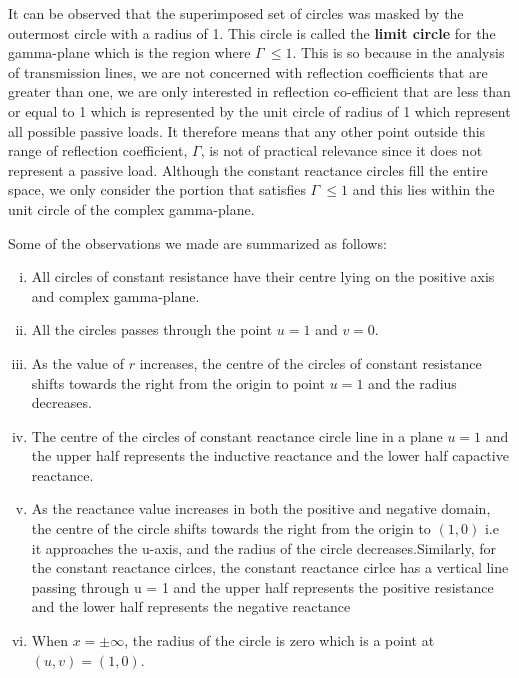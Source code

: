 It can be observed that the superimposed set of circles was masked by the outermost circle with a radius of 1. This circle is called the \textbf{limit circle} for the gamma-plane which is the region where $\Gamma\ \leq 1$. This is so because in the analysis of transmission lines, we are not concerned with reflection coefficients that are greater than one, we are only interested in reflection co-efficient that are less than or equal to 1 which is represented by the unit circle of radius of 1 which represent all possible passive loads. It therefore means that any other point outside this range of reflection coefficient, $\Gamma$, is not of practical relevance since it does not represent a passive load. Although the constant reactance circles fill the entire space, we only consider the portion that satisfies $ \Gamma\ \leq 1$ and this lies within the unit circle of the complex gamma-plane.

Some of the observations we made are summarized as follows:
\begin{enumerate}[(i)]
\item All circles of constant resistance have their centre lying on the positive axis and complex gamma-plane.
\item All the circles passes through the point $u = 1$ and $v = 0$.
\item As the value of $r$ increases, the centre of the circles of constant resistance shifts towards the right from the origin to point $u = 1$ and the radius decreases.
\item The centre of the circles of constant reactance circle line in a plane $u = 1$ and the upper half represents the inductive reactance and the lower half capactive reactance.
\item As the reactance value increases in both the positive and negative domain, the centre of the circle shifts towards the right from the origin to  $(1, 0)$ i.e it approaches the u-axis, and the radius of the circle decreases.Similarly, for the constant reactance cirlces, the constant reactance cirlce has a vertical line passing through u = 1 and the upper half represents the positive resistance and the lower half represents the negative reactance
\item When $x = \pm\infty$, the radius of the circle is zero which is a point at $(u,v) = (1,0)$.
\end{enumerate}

